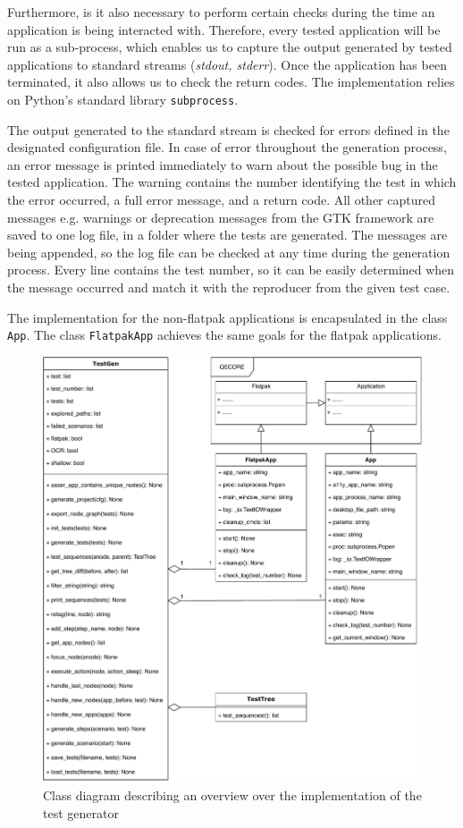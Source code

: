Furthermore, is it also necessary to perform certain checks during the time an application is being interacted with. Therefore, every tested application will be run as a sub-process, which enables us to capture the output generated by tested applications to standard streams (\textit{stdout, stderr}). Once the application has been terminated, it also allows us to check the return codes. The implementation relies on Python's standard library \texttt{subprocess}. 

The output generated to the standard stream is checked for errors defined in the designated configuration file. In case of error throughout the generation process, an error message is printed immediately to warn about the possible bug in the tested application. The warning contains the number identifying the test in which the error occurred, a full error message, and a return code. All other captured messages e.g. warnings or deprecation messages from the GTK framework are saved to one log file, in a folder where the tests are generated. The messages are being appended, so the log file can be checked at any time during the generation process. Every line contains the test number, so it can be easily determined when the message occurred and match it with the reproducer from the given test case.

The implementation for the non-flatpak applications is encapsulated in the class \texttt{App}. The class \texttt{FlatpakApp} achieves the same goals for the flatpak applications.

\begin{figure}[H]
	\centering
	\includegraphics[width=1\textwidth,clip]{obrazky-figures/TestGen_class_diagram.pdf}
	\caption{Class diagram describing an overview over the implementation of the test generator}
	\label{test_gen}
\end{figure}

